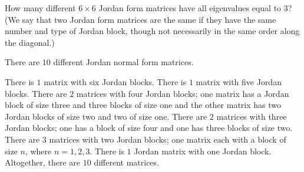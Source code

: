 \documentclass{ximera}
\begin{document}
\begin{exercise} \label{c10.5.2A}
How many different $6\times 6$ Jordan form matrices have all eigenvalues 
equal to $3$? (We say that two Jordan form matrices are the same 
if they have the same number and type of Jordan block, though not
necessarily in the same order along the diagonal.)

\begin{solution}
\ans There are $10$ different Jordan normal form matrices.

\soln  There is $1$ matrix with six Jordan blocks.  There is $1$ matrix with five
Jordan blocks.  There are $2$ matrices with four Jordan blocks; one matrix has a
Jordan block of size three and three blocks of size one and the other matrix has two
Jordan blocks of size two and two of size one.  There are $2$ matrices with three
Jordan blocks; one has a block of size four and one has three blocks of size two.
There are $3$ matrices with two Jordan blocks; one matrix each with a block of
size $n$, where $n=1,2,3$.  There is $1$ Jordan matrix with one Jordan block. 
Altogether, there are $10$ different matrices.

\end{solution}
\end{exercise}
\end{document}
